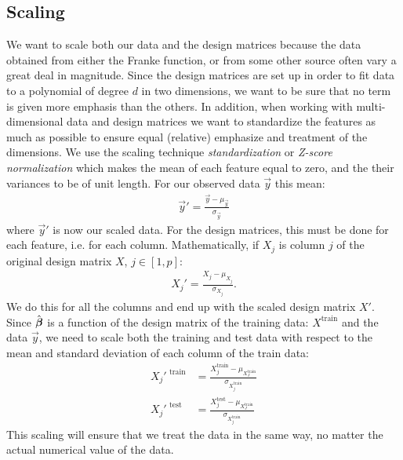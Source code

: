     
    \subsection{Scaling}\label{sec:scaling}
        We want to scale both our data and the design matrices because the data obtained from either the Franke function, or from some other source often vary a great deal in magnitude. Since the design matrices are set up in order to fit data to a polynomial of degree $d$ in two dimensions, we want to be sure that no term is given more emphasis than the others. In addition, when working with multi-dimensional data and design matrices we want to standardize the features as much as possible to ensure equal (relative) emphasize and treatment of the dimensions. We use the scaling technique \textit{standardization} or \textit{Z-score normalization} which makes the mean of each feature equal to zero, and the their variances to be of unit length. For our observed data $\vec{y}$ this mean:
        \begin{align*}
            \vec{y}' = \frac{\vec{y}-\mu_{\vec{y}}}{\sigma_{\vec{y}}}
        \end{align*}
        where $\vec{y}'$ is now our scaled data. For the design matrices, this must be done for each feature, i.e. for each column.  Mathematically, if $X_j$ is column $j$ of the original design matrix $X$, $j\in[1,p]$:
        \begin{align*}
            X_j' = \frac{X_j-\mu_{X_j}}{\sigma_{X_j}}.
        \end{align*}
        We do this for all the columns and end up with the scaled design matrix $X'$. Since $\hat{\boldsymbol{\beta}}$ is a function of the design matrix of the training data: $X^{\text{train}}$ and the data $\vec{y}$, we need to scale both the training and test data with respect to the mean and standard deviation of each column of the train data:
        \begin{align*}
            X_j'^{\text{ train}} &= \frac{X_j^{\text{train}}-\mu_{X_J^\text{train}}}{\sigma_{X_j^{\text{train}}}} \\
            X_j'^{\text{ test}} &= \frac{X_j^{\text{test}}-\mu_{X_J^\text{train}}}{\sigma_{X_j^{\text{train}}}}
        \end{align*}
        This scaling will ensure that we treat the data in the same way, no matter the actual numerical value of the data. 



